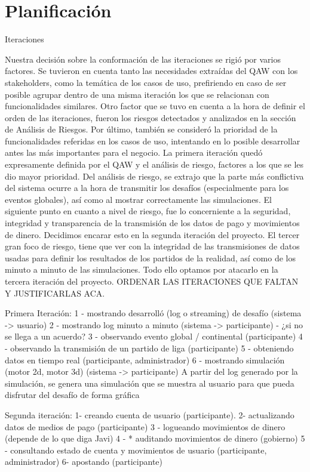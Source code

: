 \section{Planificación}
Iteraciones

	Nuestra decisión sobre la conformación de las iteraciones se rigió por varios factores. 
Se tuvieron en cuenta tanto las necesidades extraídas del QAW con los stakeholders, como la temática de los casos de uso, prefiriendo en caso de ser posible agrupar dentro de una misma iteración los que se relacionan con funcionalidades similares.
	Otro factor que se tuvo en cuenta a la hora de definir el orden de las iteraciones, fueron los riesgos detectados y analizados en la sección de Análisis de Riesgos.
	Por último, también se consideró la prioridad de la funcionalidades referidas en los casos de uso, intentando en lo posible desarrollar antes las más importantes para el negocio.
	La primera iteración quedó expresamente definida por el QAW y el análisis de riesgo, factores a los que se les dio mayor prioridad. Del análisis de riesgo, se extrajo que la parte más conflictiva del sistema ocurre a la hora de transmitir los desafíos (especialmente para los eventos globales), así como al mostrar correctamente las simulaciones.
	El siguiente punto en cuanto a nivel de riesgo, fue lo concerniente a la seguridad, integridad y transparencia de la transmisión de los datos de pago y movimientos de dinero. Decidimos encarar esto en la segunda iteración del proyecto.
	El tercer gran foco de riesgo, tiene que ver con la integridad de las transmisiones de datos usadas para definir los resultados de los partidos de la realidad, así como de los minuto a minuto de las simulaciones. Todo ello optamos por atacarlo en la tercera iteración del proyecto.
	ORDENAR LAS ITERACIONES QUE FALTAN Y JUSTIFICARLAS ACA.


Primera Iteración:
1 -  mostrando desarrolló (log o streaming) de desafío (sistema -> usuario)
2 -  mostrando log minuto a minuto (sistema -> participante) - ¿si no se llega a un acuerdo?
3 -  observando evento global / continental (participante)
4 - observando la transmisión de un partido de liga (participante)
5 -  obteniendo datos en tiempo real (participante, administrador)
6 - mostrando simulación (motor 2d, motor 3d) (sistema -> participante)
A partir del log generado por la simulación, se genera una simulación que se muestra al usuario para que pueda disfrutar del desafío de forma gráfica



Segunda iteración: 
1- creando cuenta de usuario (participante).
2- actualizando datos de medios de pago (participante)
3 - logueando movimientos de dinero (depende de lo que diga Javi)
4 - * auditando movimientos de dinero (gobierno)
5 -  consultando estado de cuenta y movimientos de usuario (participante, administrador)
6-  apostando (participante)

